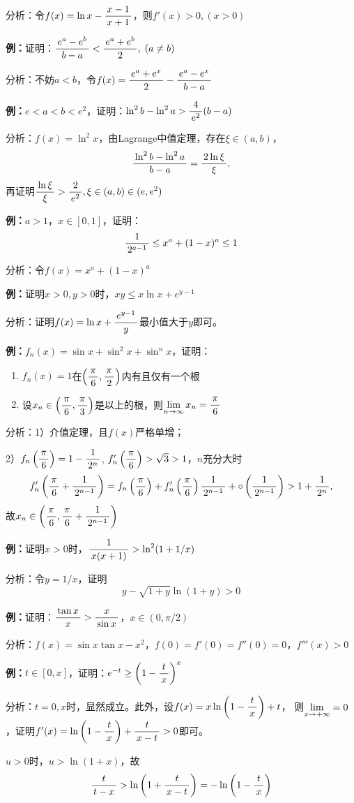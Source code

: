 分析：令$f(x)=\ln x-\df{x-1}{x+1}$，则$f'(x)>0,(x>0)$

{\bf 例：}证明：$\df{e^a-e^b}{b-a}<\df{e^a+e^b}2,\;(a\ne b)$

分析：不妨$a<b$，令$f(x)=\df{e^a+e^x}2-\df{e^a-e^x}{b-a}$

{\bf 例：}$e<a<b<e^2$，证明：$\ln^2b-\ln^2a>\df4{e^2}(b-a)$

分析：$f(x)=\ln^2x$，由Lagrange中值定理，存在$\xi\in(a,b)$，
$$\df{\ln^2b-\ln^2a}{b-a}=\df{2\ln\xi}{\xi},$$
再证明$\df{\ln\xi}{\xi}>\df2{e^2},\xi\in(a,b)\in(e,e^2)$

{\bf 例：}$a>1$，$x\in[0,1]$，证明：
$$\df1{2^{a-1}}\leq x^a+(1-x)^a\leq 1$$

分析：令$f(x)=x^a+(1-x)^a$

{\bf 例：}证明$x>0,y>0$时，$xy\leq x\ln x+e^{y-1}$

分析：证明$f(x)=\ln x+\df{e^{y-1}}y$最小值大于$y$即可。

{\bf 例：}$f_n(x)=\sin x+\sin^2x+\sin^nx$，证明：
\begin{enumerate}[1)]
  \setlength{\itemindent}{1cm}
  \item $f_n(x)=1$在$\left(\df{\pi}6,\df{\pi}2\right)$内有且仅有一个根
  \item 设$x_n\in\left(\df{\pi}6,\df{\pi}3\right)$是以上的根，则$\limn x_n=\df{\pi}6$
\end{enumerate}

分析：1）介值定理，且$f(x)$严格单增；

2）$f_n\left(\df{\pi}{6}\right)=1-\df1{2^n}$,
$f'_n\left(\df{\pi}{6}\right)>\sqrt
3>1$，$n$充分大时 $$f'_n\left(\df{\pi}{6}+\df1{2^{n-1}}\right)
=f_n\left(\df{\pi}{6}\right)+f'_n\left(\df{\pi}{6}\right)\df1{2^{n-1}}
+\circ\left(\df1{2^{n-1}}\right)>1+\df1{2^n},$$
故$x_n\in\left(\df{\pi}{6},\df{\pi}{6}+\df1{2^{n-1}}\right)$

{\bf 例：}证明$x>0$时，$\df1{x(x+1)}>\ln^2(1+1/x)$

分析：令$y=1/x$，证明
$$y-\sqrt{1+y}\ln(1+y)>0$$

{\bf 例：}证明：$\df{\tan x}x>\df x{\sin x}$，$x\in(0,\pi/2)$

分析：$f(x)=\sin x\tan x-x^2$，$f(0)=f'(0)=f''(0)=0$，$f'''(x)>0$

{\bf 例：}$t\in[0,x]$，证明：$e^{-t}\geq\left(1-\df tx\right)^x$

分析：$t=0,x$时，显然成立。此外，设$f(x)=x\ln\left(1-\df tx\right)+t$，
则$\limx{+\infty}=0$，证明$f'(x)=\ln\left(1-\df tx\right)+\df t{x-t}>0$即可。

$u>0$时，$u>\ln(1+x)$，故
$$\df t{t-x}>\ln\left(1+\df t{x-t}\right)=-\ln\left(1-\df tx\right)$$

